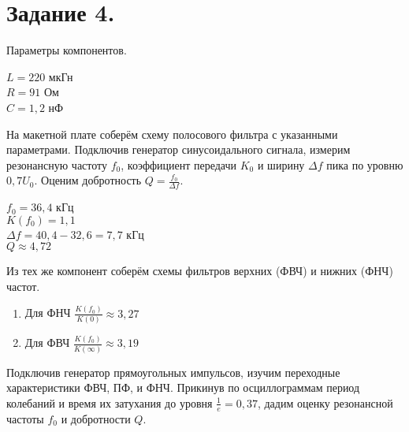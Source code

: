 	\section*{Задание 4.}

	\noindent Параметры компонентов.

	\begin{center}
		$L = 220$ мкГн \\
		$R = 91$  Ом   \\
		$C = 1,2$ нФ   \\
	\end{center}

	\noindent На макетной плате соберём схему полосового фильтра с указанными параметрами. 
	Подключив генератор синусоидального сигнала, измерим резонансную частоту $f_0$, коэффициент передачи $K_0$ и ширину
	$\Delta f$ пика по уровню $0,7 U_0$. Оценим добротность $Q = \frac{f_0}{\Delta f}$.
	
	\begin{center}
		$f_0 = 36,4$ кГц                   \\
		$K(f_0) = 1,1$                     \\
		$\Delta f = 40,4 - 32,6 = 7,7$ кГц \\
		$Q \approx 4,72$
	\end{center}


	\noindent Из тех же компонент соберём схемы фильтров верхних (ФВЧ) и нижних (ФНЧ) частот.

	\begin{enumerate}
		\item Для ФНЧ $\frac{K(f_0)}{K(0)} \approx 3,27$
		\item Для ФВЧ $\frac{K(f_0)}{K(\infty)} \approx 3,19$
	\end{enumerate}


	\noindent Подключив генератор прямоугольных импульсов, изучим переходные характеристики
	ФВЧ, ПФ, и ФНЧ. Прикинув по осциллограммам период колебаний и время их затухания
	до уровня $\frac{1}{e} = 0,37$, дадим оценку резонансной частоты $f_0$ и добротности $Q$.

